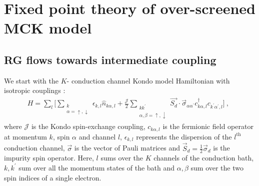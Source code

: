 \documentclass[reprint,prb,superscriptaddress]{revtex4-2}
\begin{document}
\section{Fixed point theory of over-screened MCK model}
\label{rg_section}
\subsection{RG flows towards intermediate coupling}
\label{rg_flow_section}
We start with the \(K\)- conduction channel Kondo model Hamiltonian with isotropic couplings \cite{Noz_blandin_1980}:
\begin{gather}
	\label{mc_ham}
	H = \sum_l\bigg[\sum_{\substack{k\\\alpha=\uparrow,\downarrow}}\epsilon_{k,l} \hat n_{k\alpha,l} + \frac{\mathcal{J}}{2}\sum_{\substack{kk^\prime\\\alpha,\beta= \uparrow,\downarrow}} \vec{S_d}\cdot\vec{\sigma}_{\alpha\alpha^\prime}c_{k\alpha,l}^\dagger c_{k^\prime\alpha^\prime, l}\bigg]~,~~
\end{gather}
where \(\mathcal{J}\) is the Kondo spin-exchange coupling, \(c_{k\alpha,l}\) is the fermionic field operator at momentum \(k\), spin \(\alpha\) and channel \(l\), \(\epsilon_{k,l}\) represents the dispersion of the \(l^\text{th}\) conduction channel, \(\vec \sigma\) is the vector of Pauli matrices and \(\vec S_d = \frac{1}{2}\vec \sigma_d\) is the impurity spin operator. Here, \(l\) sums over the \(K\) channels of the conduction bath, \(k,k^\prime\) sum over all the momentum states of the bath and \(\alpha,\beta\) sum over the two spin indices of a single electron.
\end{document}
